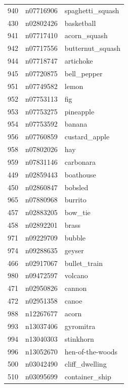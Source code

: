 \begin{table}
\begin{tabular}{cll}
940 & n07716906 & spaghetti_squash \\
430 & n02802426 & basketball \\
941 & n07717410 & acorn_squash \\
942 & n07717556 & butternut_squash \\
944 & n07718747 & artichoke \\
945 & n07720875 & bell_pepper \\
951 & n07749582 & lemon \\
952 & n07753113 & fig \\
953 & n07753275 & pineapple \\
954 & n07753592 & banana \\
956 & n07760859 & custard_apple \\
958 & n07802026 & hay \\
959 & n07831146 & carbonara \\
449 & n02859443 & boathouse \\
450 & n02860847 & bobsled \\
965 & n07880968 & burrito \\
457 & n02883205 & bow_tie \\
458 & n02892201 & brass \\
971 & n09229709 & bubble \\
974 & n09288635 & geyser \\
466 & n02917067 & bullet_train \\
980 & n09472597 & volcano \\
471 & n02950826 & cannon \\
472 & n02951358 & canoe \\
988 & n12267677 & acorn \\
993 & n13037406 & gyromitra \\
994 & n13040303 & stinkhorn \\
996 & n13052670 & hen-of-the-woods \\
500 & n03042490 & cliff_dwelling \\
510 & n03095699 & container_ship \\
\bottomrule
\end{tabular}
\end{table}
